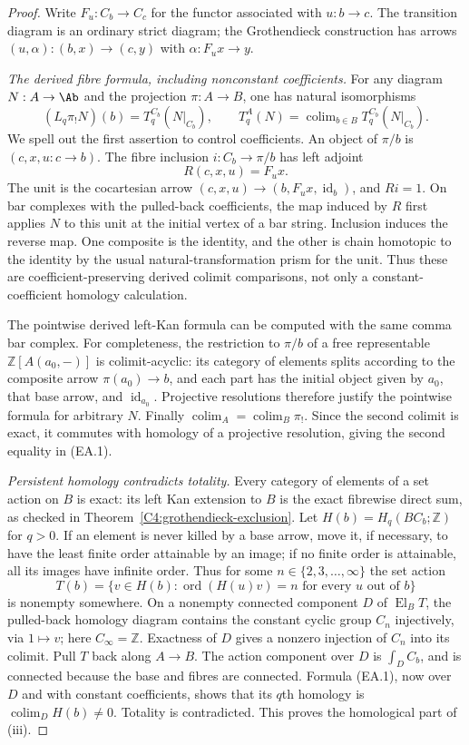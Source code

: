 \begin{proof}
Write $F_u:C_b\to C_c$ for the functor associated with
$u:b\to c$. The transition diagram is an ordinary strict
diagram; the Grothendieck construction has arrows
$(u,\alpha):(b,x)\to(c,y)$ with
$\alpha:F_u x\to y$.

\emph{The derived fibre formula, including nonconstant coefficients.}
For any diagram $N:A\to\Ab$ and the projection $\pi:A\to B$,
one has natural isomorphisms
\[
 (L_q\pi_!N)(b)=T_q^{C_b}(N|_{C_b}),\qquad
 T_q^A(N)=\operatorname{colim}_{b\in B}
             T_q^{C_b}(N|_{C_b}).
 \tag{EA.1}
\]
We spell out the first assertion to control coefficients.
An object of $\pi/b$ is $(c,x,u:c\to b)$. The fibre inclusion
$i:C_b\to\pi/b$ has left adjoint
\[
 R(c,x,u)=F_u x.
\]
The unit is the cocartesian arrow
$(c,x,u)\to(b,F_u x,\operatorname{id}_b)$, and $Ri=1$.
On bar complexes with the pulled-back coefficients, the map
induced by $R$ first applies $N$ to this unit at the initial
vertex of a bar string. Inclusion induces the reverse map.
One composite is the identity, and the other is chain homotopic
to the identity by the usual natural-transformation prism for
the unit. Thus these are coefficient-preserving derived
colimit comparisons, not only a constant-coefficient homology
calculation.

The pointwise derived left-Kan formula can be computed with
the same comma bar complex. For completeness, the restriction
to $\pi/b$ of a free representable $\mathbb Z[A(a_0,-)]$ is
colimit-acyclic: its category of elements splits according to
the composite arrow $\pi(a_0)\to b$, and each part has the
initial object given by $a_0$, that base arrow, and
$\operatorname{id}_{a_0}$. Projective resolutions therefore
justify the pointwise formula for arbitrary $N$. Finally
$\operatorname{colim}_A=\operatorname{colim}_B\pi_!$.
Since the second colimit is exact, it commutes with homology
of a projective resolution, giving the second equality in
(EA.1).

\emph{Persistent homology contradicts totality.}
Every category of elements of a set action on $B$ is exact:
its left Kan extension to $B$ is the exact fibrewise direct
sum, as checked in Theorem~\ref{C4:grothendieck-exclusion}.
Let $H(b)=H_q(BC_b;\mathbb Z)$ for $q>0$. If an element is
never killed by a base arrow, move it, if necessary, to have
the least finite order attainable by an image; if no finite
order is attainable, all its images have infinite order.
Thus for some $n\in\{2,3,\ldots,\infty\}$ the set action
\[
 T(b)=\{v\in H(b):\operatorname{ord}(H(u)v)=n
                    \text{ for every }u\text{ out of }b\}
\]
is nonempty somewhere. On a nonempty connected component
$D$ of $\operatorname{El}_B T$, the pulled-back homology
diagram contains the constant cyclic group $C_n$ injectively,
via $1\mapsto v$; here $C_\infty=\mathbb Z$. Exactness of
$D$ gives a nonzero injection of $C_n$ into its colimit.
Pull $T$ back along $A\to B$. The action component over $D$
is $\int_D C_b$, and is connected because the base and fibres
are connected. Formula (EA.1), now over $D$ and with constant
coefficients, shows that its $q$th homology is
$\operatorname{colim}_D H(b)\ne0$. Totality is contradicted.
This proves the homological part of (iii).


\end{proof}
